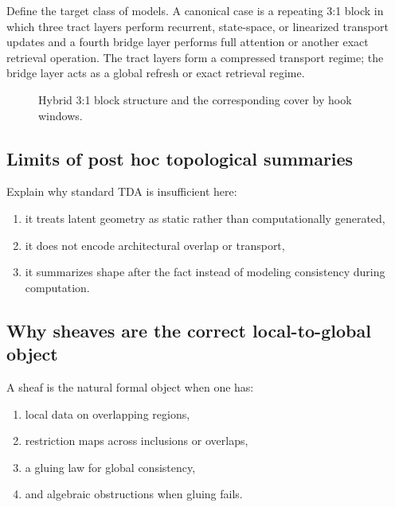 \documentclass[11pt]{article}
\begin{document}
Define the target class of models. A canonical case is a repeating 3:1 block in which three tract layers perform recurrent, state-space, or linearized transport updates and a fourth bridge layer performs full attention or another exact retrieval operation. The tract layers form a compressed transport regime; the bridge layer acts as a global refresh or exact retrieval regime.

\begin{figure}[H]
\centering
{}
\caption{Hybrid 3:1 block structure and the corresponding cover by hook windows.}
\end{figure}

\subsection{Limits of post hoc topological summaries}

Explain why standard TDA is insufficient here:
\begin{enumerate}[leftmargin=1.5em]
    \item it treats latent geometry as static rather than computationally generated,
    \item it does not encode architectural overlap or transport,
    \item it summarizes shape after the fact instead of modeling consistency during computation.
\end{enumerate}

\subsection{Why sheaves are the correct local-to-global object}

A sheaf is the natural formal object when one has:
\begin{enumerate}[leftmargin=1.5em]
    \item local data on overlapping regions,
    \item restriction maps across inclusions or overlaps,
    \item a gluing law for global consistency,
    \item and algebraic obstructions when gluing fails.
\end{enumerate}
\end{document}
